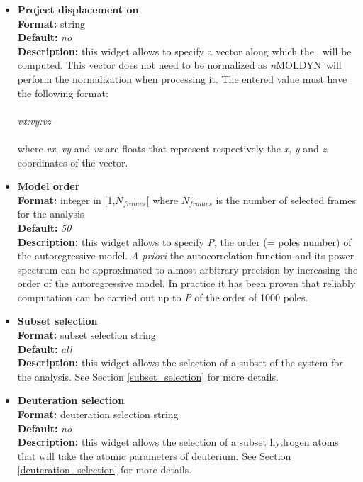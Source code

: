 \documentclass[a4paper,11pt]{report}
\newcommand{\NMOLDYN}{\textit{n}MOLDYN}
\begin{document}
\begin{itemize}
\item \textbf{Project displacement on}\\
\textbf{Format:} string\\
\textbf{Default:} \textit{no}\\
\textbf{Description:} this widget allows to specify a vector along which the \ARA\ will be computed. This vector does not 
need to be normalized as \NMOLDYN\ will perform the normalization when processing it. The entered value must have the 
following format:
\\\\
\textit{vx:vy:vz}
\\\\
where \textit{vx}, \textit{vy} and \textit{vz} are floats that represent respectively the \textit{x}, \textit{y} and \textit{z} coordinates of the vector.

\item \textbf{Model order}\\
\textbf{Format:} integer in [1,$N_{frames}$[ where $N_{frames}$ is the number of selected frames for the analysis\\
\textbf{Default:} \textit{50}\\
\textbf{Description:} this widget allows to specify \textit{P}, the order (= poles number) of the autoregressive model. {\it A priori} 
the autocorrelation function and its power spectrum can be approximated to almost arbitrary precision by increasing the 
order of the autoregressive model. In practice it has been proven that reliably computation can be carried out up to \textit{P} of 
the order of 1000 poles.

\item \textbf{Subset selection}\\
\textbf{Format:} subset selection string\\
\textbf{Default:} \textit{all}\\
\textbf{Description:} this widget allows the selection of a subset of the system for the analysis. 
See Section \ref{subset_selection} for more details.

\item \textbf{Deuteration selection}\\
\textbf{Format:} deuteration selection string\\
\textbf{Default:} \textit{no}\\
\textbf{Description:} this widget allows the selection of a subset hydrogen atoms that will take the atomic parameters 
of deuterium. See Section \ref{deuteration_selection} for more details.


\end{itemize}
\end{document}
